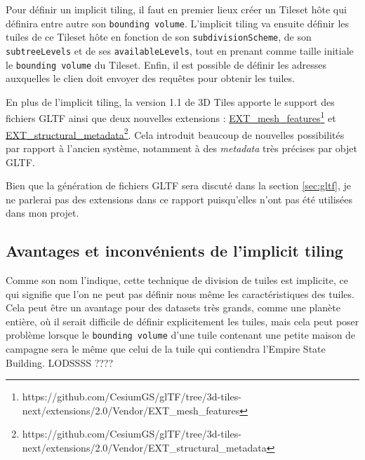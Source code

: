 Pour définir un implicit tiling, il faut en premier lieux créer un Tileset hôte qui définira entre autre son \texttt{bounding volume}. L'implicit tiling va ensuite définir les tuiles de ce Tileset hôte en fonction de son \texttt{subdivisionScheme}, de son \texttt{subtreeLevels} et de ses \texttt{availableLevels}, tout en prenant comme taille initiale le \texttt{bounding volume} du Tileset. Enfin, il est possible de définir les adresses auxquelles le clien doit envoyer des requêtes pour obtenir les tuiles.

En plus de l'implicit tiling, la version 1.1 de 3D Tiles apporte le support des fichiers GLTF ainsi que deux nouvelles extensions : \href{https://github.com/CesiumGS/glTF/tree/3d-tiles-next/extensions/2.0/Vendor/EXT_mesh_features}{EXT_mesh_features}\footnote{https://github.com/CesiumGS/glTF/tree/3d-tiles-next/extensions/2.0/Vendor/EXT_mesh_features} et \href{https://github.com/CesiumGS/glTF/tree/3d-tiles-next/extensions/2.0/Vendor/EXT_structural_metadata}{EXT_structural_metadata}\footnote{https://github.com/CesiumGS/glTF/tree/3d-tiles-next/extensions/2.0/Vendor/EXT_structural_metadata}. Cela introduit beaucoup de nouvelles possibilités par rapport à l'ancien système, notamment à des \textit{metadata} très précises par objet GLTF. 

Bien que la génération de fichiers GLTF sera discuté dans la section \ref{sec:gltf}, je ne parlerai pas des extensions dans ce rapport puisqu'elles n'ont pas été utilisées dans mon projet.

\subsection{Avantages et inconvénients de l'implicit tiling}

Comme son nom l'indique, cette technique de division de tuiles est implicite, ce qui signifie que l'on ne peut pas définir nous même les caractéristiques des tuiles. Cela peut être un avantage pour des datasets très grands, comme une planète entière, où il serait difficile de définir explicitement les tuiles, mais cela peut poser problème lorsque le \texttt{bounding volume} d'une tuile contenant une petite maison de campagne sera le même que celui de la tuile qui contiendra l'Empire State Building. LODSSSS ????